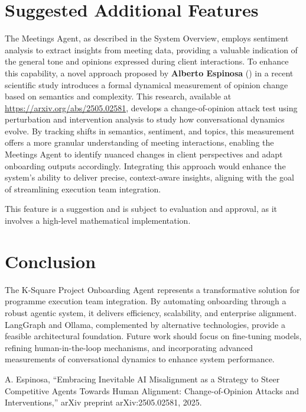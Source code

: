 \documentclass{article}
\begin{document}
\section{Suggested Additional Features}
The Meetings Agent, as described in the System Overview, employs sentiment analysis to extract insights from meeting data, providing a valuable indication of the general tone and opinions expressed during client interactions. To enhance this capability, a novel approach proposed by \textbf{Alberto Espinosa} (\cite{espinosa2025}) in a recent scientific study introduces a formal dynamical measurement of opinion change based on semantics and complexity. This research, available at \href{https://arxiv.org/abs/2505.02581}{https://arxiv.org/abs/2505.02581}, develops a change-of-opinion attack test using perturbation and intervention analysis to study how conversational dynamics evolve. By tracking shifts in semantics, sentiment, and topics, this measurement offers a more granular understanding of meeting interactions, enabling the Meetings Agent to identify nuanced changes in client perspectives and adapt onboarding outputs accordingly. Integrating this approach would enhance the system’s ability to deliver precise, context-aware insights, aligning with the goal of streamlining execution team integration. 

This feature is a suggestion and is subject to evaluation and approval, as it involves a high-level mathematical implementation.


\section{Conclusion}
The K-Square Project Onboarding Agent represents a transformative solution for programme execution team integration. By automating onboarding through a robust agentic system, it delivers efficiency, scalability, and enterprise alignment. LangGraph and Ollama, complemented by alternative technologies, provide a feasible architectural foundation. Future work should focus on fine-tuning models, refining human-in-the-loop mechanisms, and incorporating advanced measurements of conversational dynamics to enhance system performance.

\begin{thebibliography}{1}
A. Espinosa, ``Embracing Inevitable AI Misalignment as a Strategy to Steer Competitive Agents Towards Human Alignment: Change-of-Opinion Attacks and Interventions,'' arXiv preprint arXiv:2505.02581, 2025.
\end{thebibliography}
\end{document}
